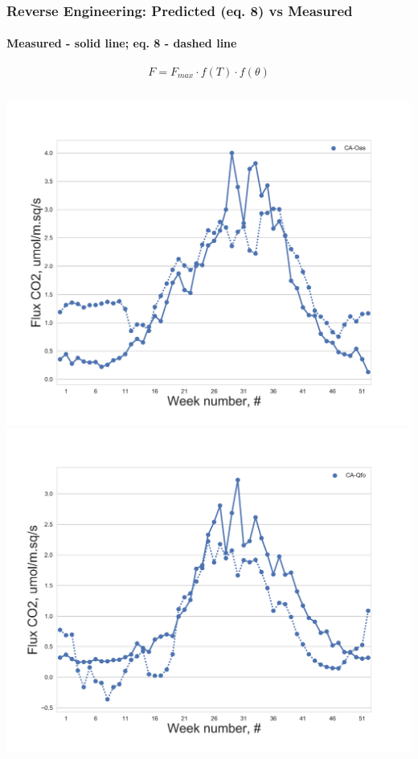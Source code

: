 \documentclass{beamer}
\begin{document}
\begin{frame}
\frametitle{Reverse Engineering: Predicted (eq. 8) vs Measured}
\framesubtitle{Measured - solid line; eq. 8 - dashed line}

\begin{equation}
\label{eq:TO}
    F = F_{max}\cdot f(T)\cdot f(\theta)
\end{equation}

\begin{columns}[t]
\centering
\includegraphics[width=\textwidth]{Reverse_engin/10.png}\\
\includegraphics[width=\textwidth]{Reverse_engin/14.png}

\end{columns}
\end{frame}
\end{document}

